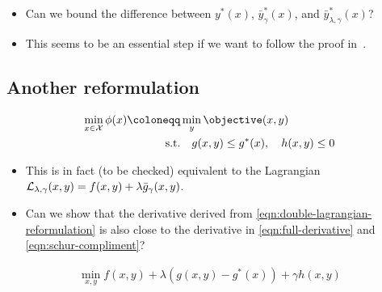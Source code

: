 {\color{red}
\begin{itemize}
    \item Can we bound the difference between $y^*(x)$, $\bar{y}^*_\gamma(x)$, and $\bar{y}^*_{\lambda,\gamma}(x)$?
    \item This seems to be an essential step if we want to follow the proof in~\cite{chen2023near,kwon2023fully}.
\end{itemize}
}


\subsection{Another reformulation}

{\color{red}
\begin{align} 
    \min_{x \in \mathcal{X}} \phi(x) \coloneqq & \min_y \objective(x, y) \\
    \text{s.t.} & \quad g(x,y) \leq g^*(x), \quad h(x,y) \leq 0 \label{eqn:two_constraints}
\end{align}
\begin{itemize}
    \item This is in fact (to be checked) equivalent to the Lagrangian $\mathcal{L}_{\lambda,\gamma}(x,y) = f(x,y) + \lambda \Bar{g}_\gamma(x,y)$.
    \item Can we show that the derivative derived from \cref{eqn:double-lagrangian-reformulation} is also close to the derivative in \cref{eqn:full-derivative} and \cref{eqn:schur-compliment}?
\end{itemize}
\begin{align}\label{eqn:double-lagrangian-reformulation}
    \min_{x,y} f(x,y) + \lambda (g(x,y) - g^*(x)) + \gamma h(x,y)
\end{align}
}